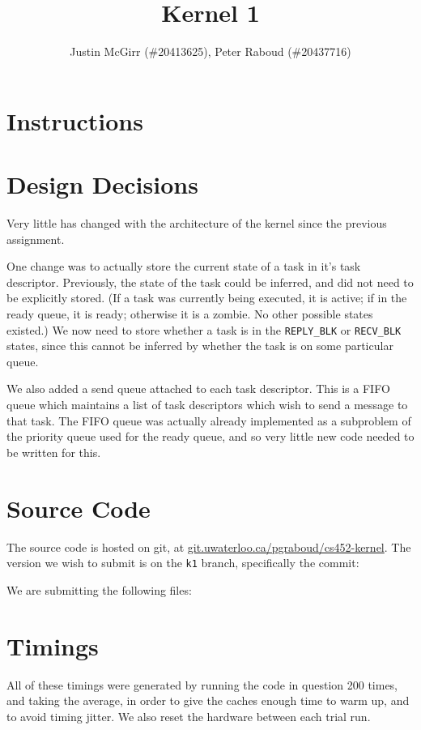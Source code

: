 \documentclass[titlepage]{article}
\begin{document}
\title{Kernel 1}
\author{Justin McGirr (\#20413625), Peter Raboud (\#20437716)}
\maketitle

\section{Instructions}

\section{Design Decisions}
Very little has changed with the architecture of the kernel since the previous assignment.

One change was to actually store the current state of a task in it's task descriptor.
Previously, the state of the task could be inferred, and did not need to be explicitly stored.
(If a task was currently being executed, it is active; if in the ready queue, it is ready; otherwise
it is a zombie. No other possible states existed.)
We now need to store whether a task is in the \texttt{REPLY\_BLK} or \texttt{RECV\_BLK} states,
since this cannot be inferred by whether the task is on some particular queue.

We also added a send queue attached to each task descriptor.
This is a FIFO queue which maintains a list of task descriptors which wish to send a message
to that task.
The FIFO queue was actually already implemented as a subproblem of the priority queue used
for the ready queue, and so very little new code needed to be written for this.

\section{Source Code}
The source code is hosted on git, at \url{git.uwaterloo.ca/pgraboud/cs452-kernel}.
The version we wish to submit is on the \texttt{k1} branch, specifically
the commit:

We are submitting the following files:



\section{Timings}
All of these timings were generated by running the code in question 200 times,
and taking the average, in order to give the caches enough time to warm up, and
to avoid timing jitter.
We also reset the hardware between each trial run.
\end{document}
